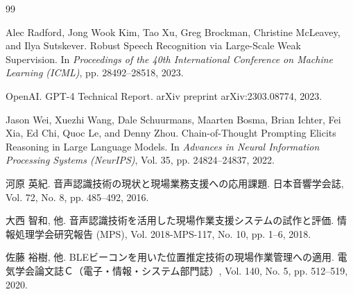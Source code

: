 \documentclass[a4paper,12pt,ja=standard,lualatex]{bxjsarticle}
\begin{document}
\begin{thebibliography}{99}
Alec Radford, Jong Wook Kim, Tao Xu, Greg Brockman, Christine McLeavey, and Ilya Sutskever.
Robust Speech Recognition via Large-Scale Weak Supervision.
In {\it Proceedings of the 40th International Conference on Machine Learning (ICML)}, pp. 28492--28518, 2023.

OpenAI.
GPT-4 Technical Report.
arXiv preprint arXiv:2303.08774, 2023.

Jason Wei, Xuezhi Wang, Dale Schuurmans, Maarten Bosma, Brian Ichter, Fei Xia, Ed Chi, Quoc Le, and Denny Zhou.
Chain-of-Thought Prompting Elicits Reasoning in Large Language Models.
In {\it Advances in Neural Information Processing Systems (NeurIPS)}, Vol. 35, pp. 24824--24837, 2022.

河原 英紀.
音声認識技術の現状と現場業務支援への応用課題.
日本音響学会誌, Vol. 72, No. 8, pp. 485--492, 2016.

大西 智和, 他.
音声認識技術を活用した現場作業支援システムの試作と評価.
情報処理学会研究報告 (MPS), Vol. 2018-MPS-117, No. 10, pp. 1--6, 2018.

佐藤 裕樹, 他.
BLEビーコンを用いた位置推定技術の現場作業管理への適用.
電気学会論文誌Ｃ（電子・情報・システム部門誌）, Vol. 140, No. 5, pp. 512--519, 2020.
\end{thebibliography}

\newpage
\appendix
\end{document}
